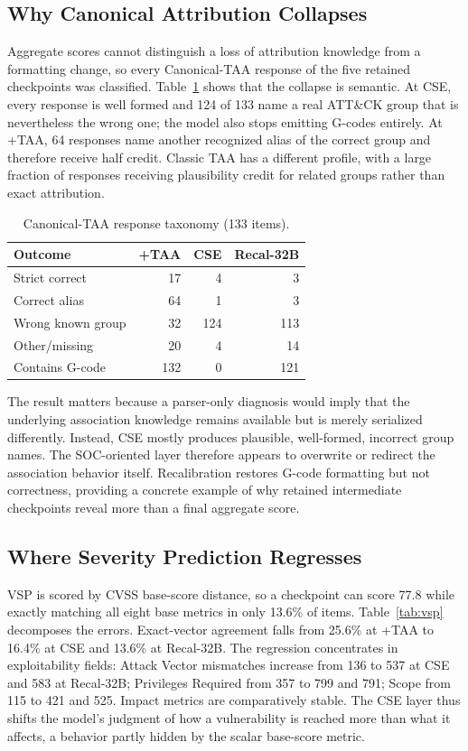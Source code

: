 \documentclass[conference]{IEEEtran}
\begin{document}
\subsection{Why Canonical Attribution Collapses}
Aggregate scores cannot distinguish a loss of attribution knowledge from a formatting change, so every Canonical-TAA response of the five retained checkpoints was classified. Table~\ref{tab:taaerrors} shows that the collapse is semantic. At CSE, every response is well formed and 124 of 133 name a real ATT\&CK group that is nevertheless the wrong one; the model also stops emitting G-codes entirely. At +TAA, 64 responses name another recognized alias of the correct group and therefore receive half credit. Classic TAA has a different profile, with a large fraction of responses receiving plausibility credit for related groups rather than exact attribution.

\begin{table}[t]
\caption{Canonical-TAA response taxonomy (133 items).}
\label{tab:taaerrors}
\centering
\scriptsize
\setlength{\tabcolsep}{2.7pt}
\begin{tabular}{@{}lrrr@{}}
\toprule
Outcome & +TAA & CSE & Recal-32B \\
\midrule
Strict correct & 17 & 4 & 3 \\
Correct alias & 64 & 1 & 3 \\
Wrong known group & 32 & 124 & 113 \\
Other/missing & 20 & 4 & 14 \\
Contains G-code & 132 & 0 & 121 \\
\bottomrule
\end{tabular}
\end{table}

The result matters because a parser-only diagnosis would imply that the underlying association knowledge remains available but is merely serialized differently. Instead, CSE mostly produces plausible, well-formed, incorrect group names. The SOC-oriented layer therefore appears to overwrite or redirect the association behavior itself. Recalibration restores G-code formatting but not correctness, providing a concrete example of why retained intermediate checkpoints reveal more than a final aggregate score.

\subsection{Where Severity Prediction Regresses}
VSP is scored by CVSS base-score distance, so a checkpoint can score 77.8 while exactly matching all eight base metrics in only 13.6\% of items. Table~\ref{tab:vsp} decomposes the errors. Exact-vector agreement falls from 25.6\% at +TAA to 16.4\% at CSE and 13.6\% at Recal-32B. The regression concentrates in exploitability fields: Attack Vector mismatches increase from 136 to 537 at CSE and 583 at Recal-32B; Privileges Required from 357 to 799 and 791; Scope from 115 to 421 and 525. Impact metrics are comparatively stable. The CSE layer thus shifts the model's judgment of how a vulnerability is reached more than what it affects, a behavior partly hidden by the scalar base-score metric.
\end{document}
